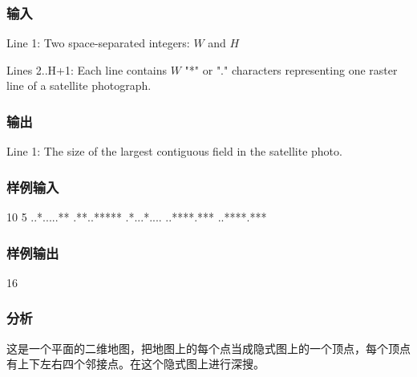 \subsubsection{输入}
Line 1: Two space-separated integers: $W$ and $H$ 

Lines 2..H+1: Each line contains $W$ "*" or "." characters representing one raster line of a satellite photograph.


\subsubsection{输出}
Line 1: The size of the largest contiguous field in the satellite photo.


\subsubsection{样例输入}
\begin{Code}
10 5
..*.....**
.**..*****
.*...*....
..****.***
..****.***
\end{Code}


\subsubsection{样例输出}
\begin{Code}
16
\end{Code}


\subsubsection{分析}
这是一个平面的二维地图，把地图上的每个点当成隐式图上的一个顶点，每个顶点有上下左右四个邻接点。在这个隐式图上进行深搜。


